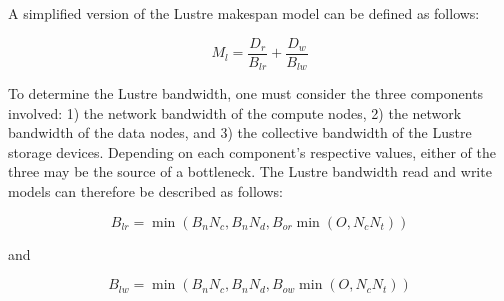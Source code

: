 \documentclass{report}
\begin{document}
    A simplified version of the Lustre makespan model can be defined as follows:

    \begin{equation}\label{eq:lustrenpc}
        M_{l} =  \frac{D_{r}}{B_{lr}} + \frac{D_{w}}{B_{lw}}
    \end{equation}


    To determine the Lustre bandwidth, one must consider the three components involved:
1) the network bandwidth of the compute nodes, 2) the network bandwidth of the data nodes,
and 3) the collective bandwidth of the Lustre storage devices. Depending on each component's
respective values, either of the three may be the source of a bottleneck. The
Lustre bandwidth read and write models can therefore be described as follows:

    \begin{equation}\label{eq:blr}
        B_{lr} = \min{(B_{n}N_{c}, B_{n}N_{d}, B_{or}\min{(O, N_{c}N_{t})})}
    \end{equation}

    and

    \begin{equation}\label{eq:blw}
        B_{lw} = \min{(B_{n}N_{c}, B_{n}N_{d}, B_{ow}\min{(O, N_{c}N_{t})})}
    \end{equation}

\end{document}
